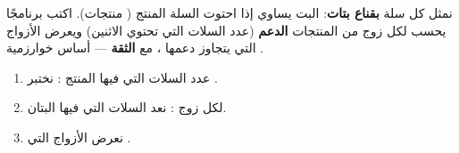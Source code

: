 \begin{statement}
نمثل كل سلة \textbf{بقناع بتات}: البت  يساوي  إذا احتوت السلة المنتج  ( منتجات). اكتب برنامجًا يحسب لكل زوج من المنتجات \textbf{الدعم} (عدد السلات التي تحتوي الاثنين) ويعرض الأزواج التي يتجاوز دعمها ، مع \textbf{الثقة}  — أساس خوارزمية .
\end{statement}
\begin{stepsbox}\begin{enumerate}
\item {} عدد السلات التي فيها المنتج : نختبر .
\item لكل زوج : نعد السلات التي فيها البتان.
\item نعرض الأزواج التي .
\end{enumerate}\end{stepsbox}
